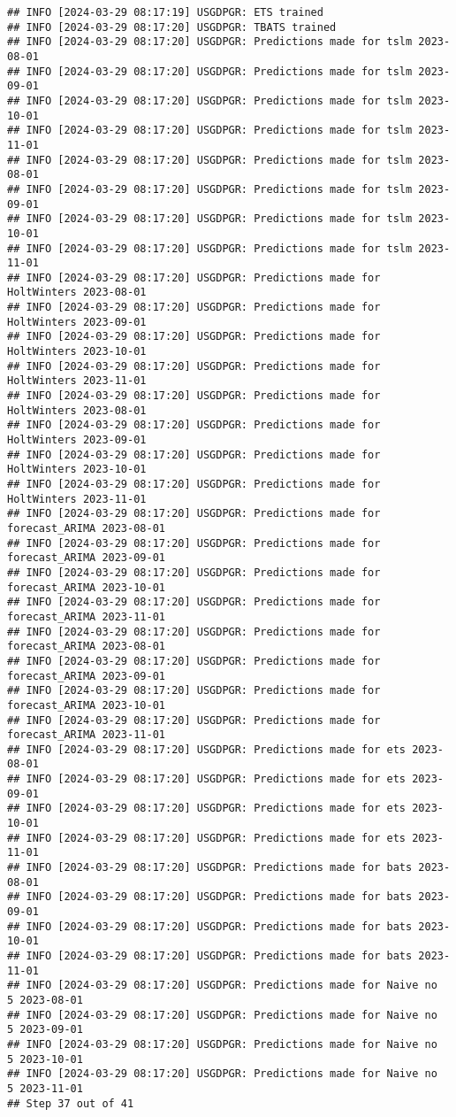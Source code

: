 \documentclass[
]{article}
\begin{document}
\begin{verbatim}
## INFO [2024-03-29 08:17:19] USGDPGR: ETS trained
## INFO [2024-03-29 08:17:20] USGDPGR: TBATS trained
## INFO [2024-03-29 08:17:20] USGDPGR: Predictions made for tslm 2023-08-01
## INFO [2024-03-29 08:17:20] USGDPGR: Predictions made for tslm 2023-09-01
## INFO [2024-03-29 08:17:20] USGDPGR: Predictions made for tslm 2023-10-01
## INFO [2024-03-29 08:17:20] USGDPGR: Predictions made for tslm 2023-11-01
## INFO [2024-03-29 08:17:20] USGDPGR: Predictions made for tslm 2023-08-01
## INFO [2024-03-29 08:17:20] USGDPGR: Predictions made for tslm 2023-09-01
## INFO [2024-03-29 08:17:20] USGDPGR: Predictions made for tslm 2023-10-01
## INFO [2024-03-29 08:17:20] USGDPGR: Predictions made for tslm 2023-11-01
## INFO [2024-03-29 08:17:20] USGDPGR: Predictions made for HoltWinters 2023-08-01
## INFO [2024-03-29 08:17:20] USGDPGR: Predictions made for HoltWinters 2023-09-01
## INFO [2024-03-29 08:17:20] USGDPGR: Predictions made for HoltWinters 2023-10-01
## INFO [2024-03-29 08:17:20] USGDPGR: Predictions made for HoltWinters 2023-11-01
## INFO [2024-03-29 08:17:20] USGDPGR: Predictions made for HoltWinters 2023-08-01
## INFO [2024-03-29 08:17:20] USGDPGR: Predictions made for HoltWinters 2023-09-01
## INFO [2024-03-29 08:17:20] USGDPGR: Predictions made for HoltWinters 2023-10-01
## INFO [2024-03-29 08:17:20] USGDPGR: Predictions made for HoltWinters 2023-11-01
## INFO [2024-03-29 08:17:20] USGDPGR: Predictions made for forecast_ARIMA 2023-08-01
## INFO [2024-03-29 08:17:20] USGDPGR: Predictions made for forecast_ARIMA 2023-09-01
## INFO [2024-03-29 08:17:20] USGDPGR: Predictions made for forecast_ARIMA 2023-10-01
## INFO [2024-03-29 08:17:20] USGDPGR: Predictions made for forecast_ARIMA 2023-11-01
## INFO [2024-03-29 08:17:20] USGDPGR: Predictions made for forecast_ARIMA 2023-08-01
## INFO [2024-03-29 08:17:20] USGDPGR: Predictions made for forecast_ARIMA 2023-09-01
## INFO [2024-03-29 08:17:20] USGDPGR: Predictions made for forecast_ARIMA 2023-10-01
## INFO [2024-03-29 08:17:20] USGDPGR: Predictions made for forecast_ARIMA 2023-11-01
## INFO [2024-03-29 08:17:20] USGDPGR: Predictions made for ets 2023-08-01
## INFO [2024-03-29 08:17:20] USGDPGR: Predictions made for ets 2023-09-01
## INFO [2024-03-29 08:17:20] USGDPGR: Predictions made for ets 2023-10-01
## INFO [2024-03-29 08:17:20] USGDPGR: Predictions made for ets 2023-11-01
## INFO [2024-03-29 08:17:20] USGDPGR: Predictions made for bats 2023-08-01
## INFO [2024-03-29 08:17:20] USGDPGR: Predictions made for bats 2023-09-01
## INFO [2024-03-29 08:17:20] USGDPGR: Predictions made for bats 2023-10-01
## INFO [2024-03-29 08:17:20] USGDPGR: Predictions made for bats 2023-11-01
## INFO [2024-03-29 08:17:20] USGDPGR: Predictions made for Naive no  5 2023-08-01
## INFO [2024-03-29 08:17:20] USGDPGR: Predictions made for Naive no  5 2023-09-01
## INFO [2024-03-29 08:17:20] USGDPGR: Predictions made for Naive no  5 2023-10-01
## INFO [2024-03-29 08:17:20] USGDPGR: Predictions made for Naive no  5 2023-11-01
## Step 37 out of 41
\end{verbatim}
\end{document}
